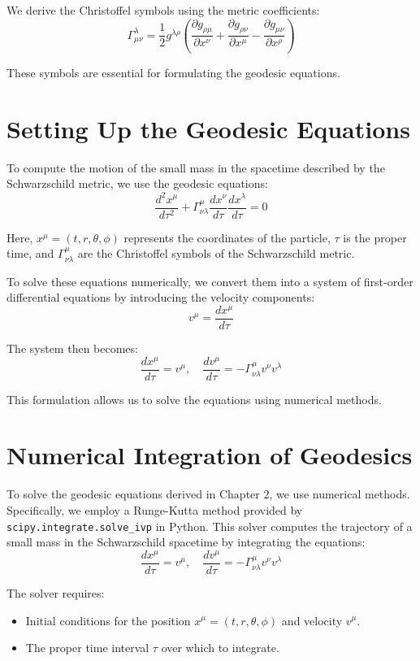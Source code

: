 \documentclass[12pt]{article}
\begin{document}
We derive the Christoffel symbols using the metric coefficients:
\[
\Gamma^\lambda_{\mu\nu} = \frac{1}{2} g^{\lambda\rho} \left( \frac{\partial g_{\rho\mu}}{\partial x^\nu} + \frac{\partial g_{\rho\nu}}{\partial x^\mu} - \frac{\partial g_{\mu\nu}}{\partial x^\rho} \right)
\]

These symbols are essential for formulating the geodesic equations.


\section{Setting Up the Geodesic Equations}

To compute the motion of the small mass in the spacetime described by the Schwarzschild metric, we use the geodesic equations:
\[
\frac{d^2 x^\mu}{d\tau^2} + \Gamma^\mu_{\nu\lambda} \frac{dx^\nu}{d\tau} \frac{dx^\lambda}{d\tau} = 0
\]

Here, \(x^\mu = (t, r, \theta, \phi)\) represents the coordinates of the particle, \(\tau\) is the proper time, and \(\Gamma^\mu_{\nu\lambda}\) are the Christoffel symbols of the Schwarzschild metric.

To solve these equations numerically, we convert them into a system of first-order differential equations by introducing the velocity components:
\[
v^\mu = \frac{dx^\mu}{d\tau}
\]

The system then becomes:
\[
\frac{dx^\mu}{d\tau} = v^\mu, \quad \frac{dv^\mu}{d\tau} = -\Gamma^\mu_{\nu\lambda} v^\nu v^\lambda
\]

This formulation allows us to solve the equations using numerical methods.


\section{Numerical Integration of Geodesics}

To solve the geodesic equations derived in Chapter 2, we use numerical methods. Specifically, we employ a Runge-Kutta method provided by \texttt{scipy.integrate.solve\_ivp} in Python. This solver computes the trajectory of a small mass in the Schwarzschild spacetime by integrating the equations:
\[
\frac{dx^\mu}{d\tau} = v^\mu, \quad \frac{dv^\mu}{d\tau} = -\Gamma^\mu_{\nu\lambda} v^\nu v^\lambda
\]

The solver requires:
\begin{itemize}
    \item Initial conditions for the position \(x^\mu = (t, r, \theta, \phi)\) and velocity \(v^\mu\).
    \item The proper time interval \(\tau\) over which to integrate.
\end{itemize}
\end{document}
